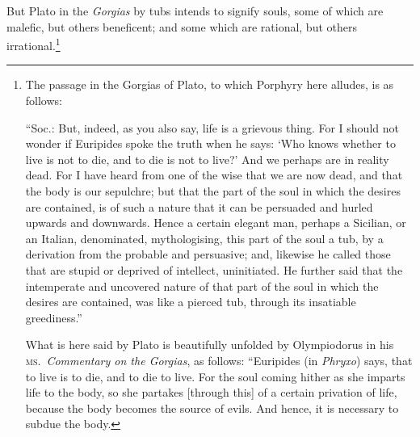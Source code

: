 \documentclass[12pt]{article}
\begin{document}
\noindent But Plato in the \textit{Gorgias} by tubs intends to signify souls,
some of which are malefic, but others beneficent; and some which are rational,
but others irrational.\footnote{The passage in the Gorgias of Plato, to which
Porphyry here alludes, is as follows:

``Soc.: But, indeed, as you also say, life is a grievous thing. For I should
not wonder if Euripides spoke the truth when he says: `Who knows whether to
live is not to die, and to die is not to live?' And we perhaps are in reality
dead. For I have heard from one of the wise that we are now dead, and that the
body is our sepulchre; but that the part of the soul in which the desires are
contained, is of such a nature that it can be persuaded and hurled upwards and
downwards. Hence a certain elegant man, perhaps a Sicilian, or an Italian,
denominated, mythologising, this part of the soul a tub, by a derivation from
the probable and persuasive; and, likewise he called those that are stupid or
deprived of intellect, uninitiated. He further said that the intemperate and
uncovered nature of that part of the soul in which the desires are contained,
was like a pierced tub, through its insatiable greediness.''

What is here said by Plato is beautifully unfolded by Olympiodorus in his
\textsc{ms.}~\textit{Commentary on the Gorgias}, as follows: ``Euripides (in
\textit{Phryxo}) says, that to live is to die, and to die to live. For the soul
coming hither as she imparts life to the body, so she partakes [through this]
of a certain privation of life, because the body becomes the source of evils.
And hence, it is necessary to subdue the body.

}
\end{document}
